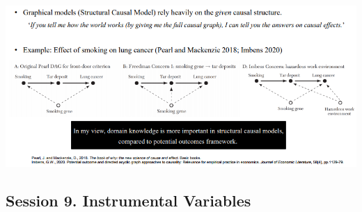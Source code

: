 \documentclass[
]{book}
\theoremstyle{definition}
\theoremstyle{definition}
\theoremstyle{definition}
\theoremstyle{definition}
\theoremstyle{remark}
\begin{document}
\includegraphics{figures/55.png}

\hypertarget{session-9.-instrumental-variables}{%
\subsection{Session 9. Instrumental Variables}\label{session-9.-instrumental-variables}}
\end{document}
